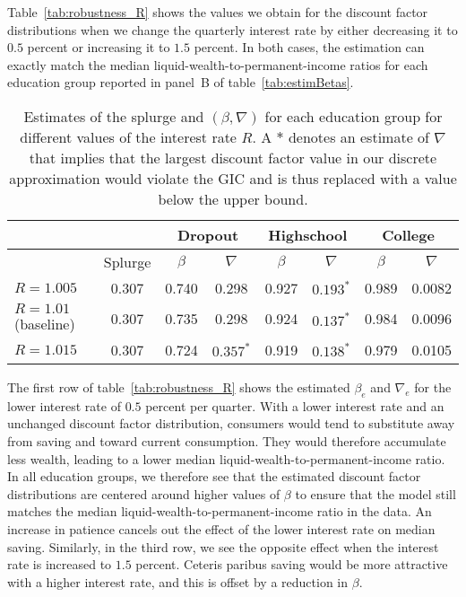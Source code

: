 \documentclass[\PathToRoot/\ProjectName]{subfiles}
\begin{document}
Table~\ref{tab:robustness_R} shows the values we obtain for the discount factor distributions when we change the quarterly interest rate by either decreasing it to $0.5$ percent or increasing it to $1.5$ percent. In both cases, the estimation can exactly match the median liquid-wealth-to-permanent-income ratios for each education group reported in panel~B of table~\ref{tab:estimBetas}.

\begin{table}[t]
  \begin{center}
    \begin{tabular}{lc|cccccc}
      \toprule
                            &         & \multicolumn{2}{c}{Dropout} & \multicolumn{2}{c}{Highschool} & \multicolumn{2}{c}{College}                                    \\ \midrule
                            & Splurge & $\beta$                     & $\nabla$                       & $\beta$                     & $\nabla$    & $\beta$ & $\nabla$ \\ \midrule
      $R = 1.005$           & 0.307   & 0.740                       & 0.298                          & 0.927                       & $0.193^{*}$ & 0.989   & 0.0082   \\
      $R = 1.01$ (baseline) & 0.307   & 0.735                       & 0.298                          & 0.924                       & $0.137^{*}$ & 0.984   & 0.0096   \\
      $R = 1.015$           & 0.307   & 0.724                       & $0.357^{*}$                    & 0.919                       & $0.138^{*}$ & 0.979   & 0.0105
      \\ \bottomrule
    \end{tabular}
    \caption{Estimates of the splurge and $(\beta,\nabla)$ for each education group for different values of the interest rate $R$.
      A $*$ denotes an estimate of $\nabla$ that implies that the largest discount factor value in our discrete approximation would violate the GIC and is thus replaced with a value below the upper bound.}
    \whenintegrated{\label{tab:robustness_R}} 
  \end{center}
\end{table}

The first row of table~\ref{tab:robustness_R} shows the estimated $\beta_e$ and $\nabla_e$ for the lower interest rate of $0.5$ percent per quarter.
With a lower interest rate and an unchanged discount factor distribution, consumers would tend to substitute away from saving and toward current consumption.
They would therefore accumulate less wealth, leading to a lower median liquid-wealth-to-permanent-income ratio.
In all education groups, we therefore see that the estimated discount factor distributions are centered around higher values of $\beta$ to ensure that the model still matches the median liquid-wealth-to-permanent-income ratio in the data.
An increase in patience cancels out the effect of the lower interest rate on median saving.
Similarly, in the third row, we see the opposite effect when the interest rate is increased to $1.5$ percent.
Ceteris paribus saving would be more attractive with a higher interest rate, and this is offset by a reduction in $\beta$.
\end{document}
